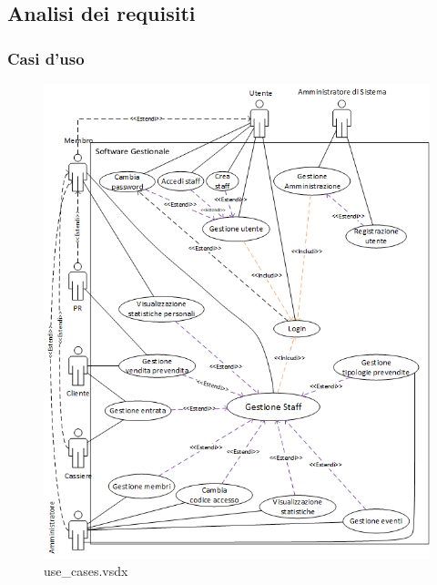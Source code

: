 \documentclass[a4paper]{article}
\begin{document}
\subsection{Analisi dei requisiti}
\subsubsection{Casi d'uso}



\begin{figure}[H]
    \includegraphics[scale=1]{Analisi/Cases/use_cases.png}
    \centering
    \caption{use\_cases.vsdx}
\end{figure}
\end{document}
